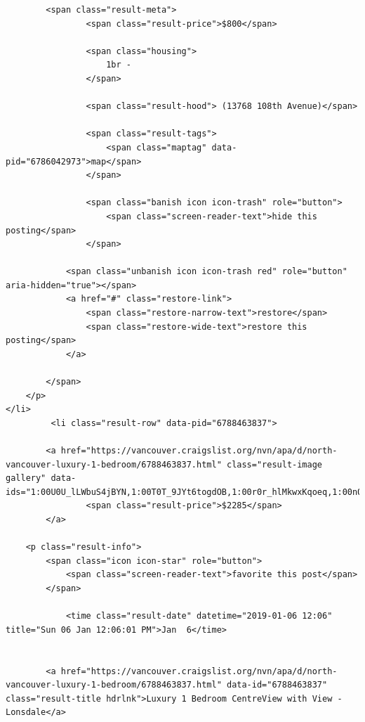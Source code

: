 \documentclass[
]{article}
\begin{document}
\begin{verbatim}
        <span class="result-meta">
                <span class="result-price">$800</span>

                <span class="housing">
                    1br -
                </span>

                <span class="result-hood"> (13768 108th Avenue)</span>

                <span class="result-tags">
                    <span class="maptag" data-pid="6786042973">map</span>
                </span>

                <span class="banish icon icon-trash" role="button">
                    <span class="screen-reader-text">hide this posting</span>
                </span>

            <span class="unbanish icon icon-trash red" role="button" aria-hidden="true"></span>
            <a href="#" class="restore-link">
                <span class="restore-narrow-text">restore</span>
                <span class="restore-wide-text">restore this posting</span>
            </a>

        </span>
    </p>
</li>
         <li class="result-row" data-pid="6788463837">

        <a href="https://vancouver.craigslist.org/nvn/apa/d/north-vancouver-luxury-1-bedroom/6788463837.html" class="result-image gallery" data-ids="1:00U0U_lLWbuS4jBYN,1:00T0T_9JYt6togdOB,1:00r0r_hlMkwxKqoeq,1:00n0n_2U8StpqVRYX,1:00M0M_e93iEG4BRAu,1:00a0a_PaOxz3JIfI,1:00o0o_4VznEcB0NC5,1:00V0V_1xyllKkwa9A,1:00G0G_lufKMygCGj6,1:00202_lutoxKbVTcP,1:00R0R_cQFYHDzGrOK,1:00000_hTXSBn1SrQN,1:00r0r_2toXdps0bT1,1:01616_dbAnv07FaE7,1:00g0g_1yOIckt0O1h,1:00m0m_a9fAvCYmO9L,1:00C0C_8EO8Yl1ELUi,1:00I0I_iL6IqV8n5MB,1:00b0b_c5e1FbpbWUZ,1:01717_6lFcmuJ2glV">
                <span class="result-price">$2285</span>
        </a>

    <p class="result-info">
        <span class="icon icon-star" role="button">
            <span class="screen-reader-text">favorite this post</span>
        </span>

            <time class="result-date" datetime="2019-01-06 12:06" title="Sun 06 Jan 12:06:01 PM">Jan  6</time>


        <a href="https://vancouver.craigslist.org/nvn/apa/d/north-vancouver-luxury-1-bedroom/6788463837.html" data-id="6788463837" class="result-title hdrlnk">Luxury 1 Bedroom CentreView with View - Lonsdale</a>

\end{verbatim}
\end{document}
